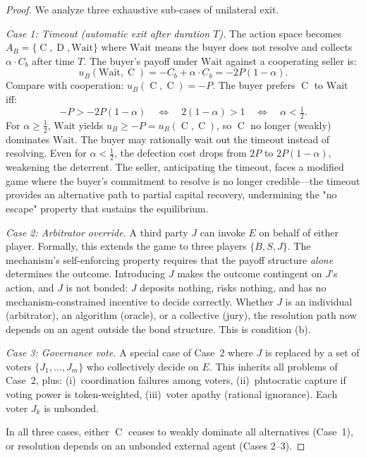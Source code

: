 \documentclass[11pt,a4paper]{article}
\theoremstyle{definition}
\theoremstyle{remark}
\newcommand{\pay}{P}           %
\newcommand{\bbond}{C_b}       %
\newcommand{\ub}{u_B}          %
\DeclareMathOperator{\Coop}{C}
\DeclareMathOperator{\Def}{D}
\begin{document}
\begin{proof}
We analyze three exhaustive sub-cases of unilateral exit.

\emph{Case 1: Timeout (automatic exit after duration $T$).}
The action space becomes $A_B = \{\Coop, \Def, \text{Wait}\}$ where
$\text{Wait}$ means the buyer does not resolve and collects
$\alpha \cdot \bbond$ after time $T$. The buyer's payoff under
$\text{Wait}$ against a cooperating seller is:
\begin{equation}
  \ub(\text{Wait}, \Coop) = -\bbond + \alpha \cdot \bbond
    = -2\pay(1 - \alpha).
  \label{eq:timeout-payoff}
\end{equation}
Compare with cooperation: $\ub(\Coop, \Coop) = -\pay$. The buyer
prefers $\Coop$ to $\text{Wait}$ iff:
\begin{equation}
  -\pay > -2\pay(1 - \alpha)
  \quad\Longleftrightarrow\quad
  2(1 - \alpha) > 1
  \quad\Longleftrightarrow\quad
  \alpha < \tfrac{1}{2}.
  \label{eq:timeout-threshold}
\end{equation}
For $\alpha \geq \frac{1}{2}$, $\text{Wait}$ yields
$\ub \geq -\pay = \ub(\Coop, \Coop)$, so $\Coop$ no longer
(weakly) dominates $\text{Wait}$. The buyer may rationally wait out the
timeout instead of resolving. Even for $\alpha < \frac{1}{2}$, the
defection cost drops from $2\pay$ to $2\pay(1 - \alpha)$, weakening
the deterrent. The seller, anticipating the timeout, faces a modified
game where the buyer's commitment to resolve is no longer credible---the
timeout provides an alternative path to partial capital recovery,
undermining the "no escape" property that sustains the equilibrium.

\emph{Case 2: Arbitrator override.}
A third party $J$ can invoke $E$ on behalf of either player.
Formally, this extends the game to three players $\{B, S, J\}$.
The mechanism's self-enforcing property requires that the payoff
structure \emph{alone} determines the outcome. Introducing $J$
makes the outcome contingent on $J$'s action, and $J$ is not bonded:
$J$ deposits nothing, risks nothing, and has no mechanism-constrained
incentive to decide correctly. Whether $J$ is an individual
(arbitrator), an algorithm (oracle), or a collective (jury), the
resolution path now depends on an agent outside the bond structure.
This is condition (b).

\emph{Case 3: Governance vote.}
A special case of Case~2 where $J$ is replaced by a set of voters
$\{J_1, \ldots, J_m\}$ who collectively decide on $E$. This inherits
all problems of Case~2, plus: (i)~coordination failures among voters,
(ii)~plutocratic capture if voting power is token-weighted,
(iii)~voter apathy (rational ignorance). Each voter $J_k$ is unbonded.

In all three cases, either $\Coop$ ceases to weakly dominate all
alternatives (Case~1), or resolution depends on an unbonded external
agent (Cases 2--3). \qedhere
\end{proof}
\end{document}
